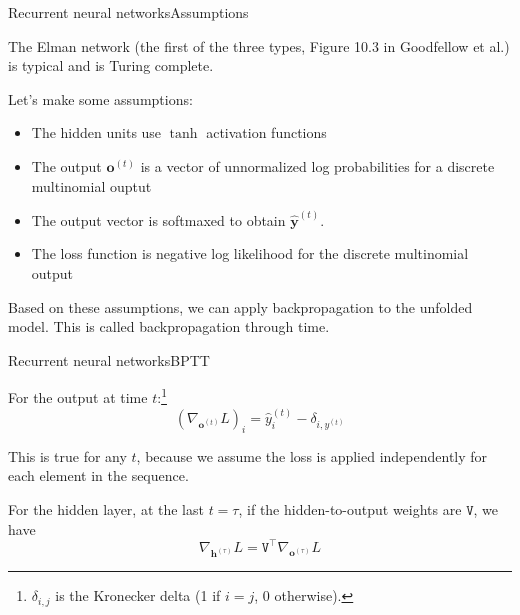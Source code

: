 \documentclass{beamer}
\renewcommand{\vec}[1]{\boldsymbol{#1}}
\newcommand{\mat}[1]{\mathtt{#1}}
\newcommand{\T}[0]{\top}
\begin{document}
\begin{frame}{Recurrent neural networks}{Assumptions}

  The Elman network (the first of the three types, Figure 10.3 in
  Goodfellow et al.) is typical and is Turing complete.

  \medskip

  Let's make some assumptions:
  \begin{itemize}
  \item The hidden units use $\tanh$ activation functions
  \item The output $\vec{o}^{(t)}$ is a vector of unnormalized log
    probabilities for a discrete multinomial ouptut
  \item The output vector is softmaxed to obtain $\hat{\vec{y}}^{(t)}$.
  \item The loss function is negative log likelihood for the discrete
    multinomial output
  \end{itemize}

  Based on these assumptions, we can apply backpropagation to the unfolded
  model. This is called \alert{backpropagation through time}.

\end{frame}


\begin{frame}{Recurrent neural networks}{BPTT}

  For the \alert{output at time $t$}:\footnote{$\delta_{i,j}$ is the
    Kronecker delta (1 if $i=j$, 0 otherwise).}
  \[ (\nabla_{\vec{o}^{(t)}}L)_i = \hat{y}_i^{(t)}-\delta_{i,y^{(t)}} \]

  This is true for any $t$, because we assume the loss is applied
  independently for each element in the sequence.
  
  \medskip

  For the hidden layer, \alert{at the last $t=\tau$}, if the
  hidden-to-output weights are $\mat{V}$, we have
  \[ \nabla_{\vec{h}^{(\tau)}}L = \mat{V}^\T \nabla_{\vec{o}^{(\tau)}}L \]

\end{frame}
\end{document}
